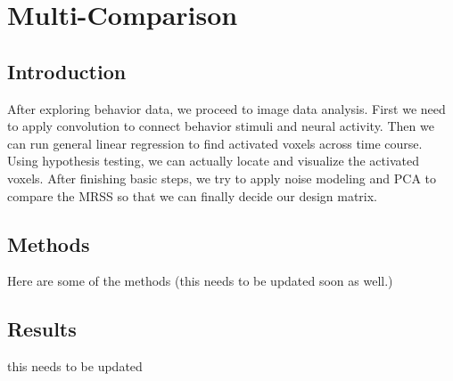 \section{Multi-Comparison}
\subsection{Introduction}
\noindent
After exploring behavior data, we proceed to image data analysis.  First we need to apply convolution to connect behavior stimuli and neural activity. Then we can run general linear regression to find activated voxels across time course. Using hypothesis testing, we can actually locate and visualize the activated voxels. After finishing basic steps, we try to apply noise modeling and PCA to compare the MRSS so that we can finally decide our design matrix.

\subsection{Methods}
Here are some of the methods (this needs to be updated soon as well.)

\subsection {Results}
this needs to be updated





